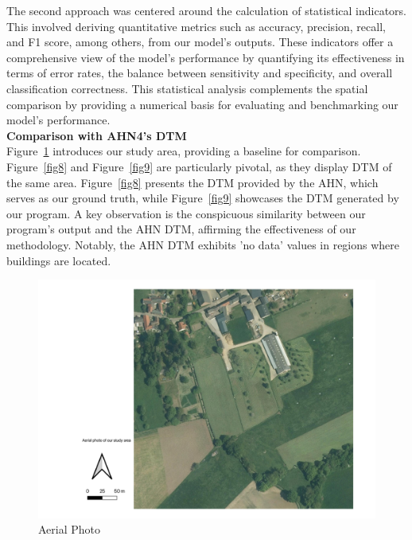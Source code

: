 \documentclass{article}
\begin{document}
\noindent The second approach was centered around the calculation of statistical indicators. This involved deriving quantitative metrics such as accuracy, precision, recall, and F1 score, among others, from our model's outputs. These indicators offer a comprehensive view of the model's performance by quantifying its effectiveness in terms of error rates, the balance between sensitivity and specificity, and overall classification correctness. This statistical analysis complements the spatial comparison by providing a numerical basis for evaluating and benchmarking our model's performance.\\

\noindent \textbf{Comparison with AHN4's DTM}\\
Figure~\ref{fig7} introduces our study area, providing a baseline for comparison. Figure~\ref{fig8} and Figure~\ref{fig9} are particularly pivotal, as they display DTM of the same area. Figure~\ref{fig8} presents the DTM provided by the AHN, which serves as our ground truth, while Figure~\ref{fig9} showcases the DTM generated by our program. A key observation is the conspicuous similarity between our program's output and the AHN DTM, affirming the effectiveness of our methodology. Notably, the AHN DTM exhibits 'no data' values in regions where buildings are located.\\

\begin{figure}[H]
    \centering
    \includegraphics[width=0.5\linewidth]{Figures/fg7.png}
    \caption{Aerial Photo}
    \label{fig7}
\end{figure}
\end{document}

